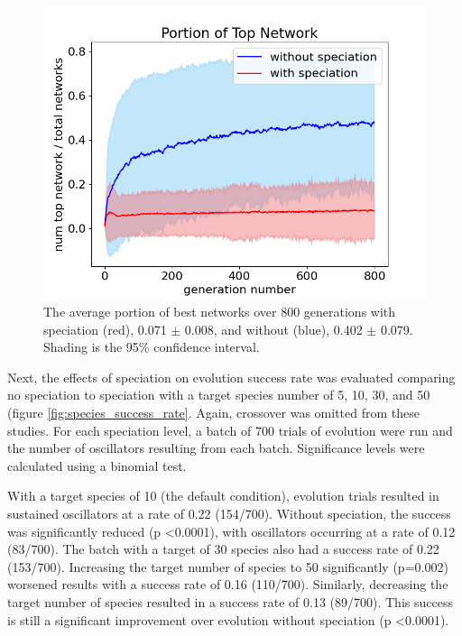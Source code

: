 \documentclass[12pt]{report}
\begin{document}
\begin{figure}
	\centering
    \includegraphics[width=18cm]{images/portion_best_network.png}
    \caption[Portion of top network over time, with and without speciation]{The average portion of best networks over 800 generations with speciation (red), 0.071 $\pm$ 0.008, and without (blue), 0.402 $\pm$ 0.079. Shading is the 95\% confidence interval.}
    \label{fig:portion_best_network}
\end{figure}


Next, the effects of speciation on evolution success rate was evaluated comparing no speciation to speciation with a target species number of 5, 10, 30, and 50 (figure \ref{fig:species_success_rate}. Again, crossover was omitted from these studies. For each speciation level, a batch of 700 trials of evolution were run and the number of oscillators resulting from each batch. Significance levels were calculated using a binomial test. 

With a target species of 10 (the default condition), evolution trials resulted in sustained oscillators at a rate of 0.22 (154/700). Without speciation, the success was significantly reduced (p \textless 0.0001), with oscillators occurring at a rate of 0.12 (83/700). The batch with a target of 30 species also had a success rate of 0.22 (153/700). Increasing the target number of species to 50 significantly (p=0.002) worsened results with a success rate of 0.16 (110/700). Similarly, decreasing the target number of species resulted in a success rate of 0.13 (89/700). This success is still a significant improvement over evolution without speciation (p \textless 0.0001).
\end{document}

